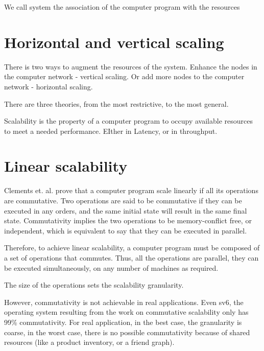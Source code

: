 We call system the association of the computer program with the resources


\section{Horizontal and vertical scaling}

There is two ways to augment the resources of the system.
Enhance the nodes in the computer network - vertical scaling.
Or add more nodes to the computer network - horizontal scaling.



There are three theories, from the most restrictive, to the most general.


Scalability is the property of a computer program to occupy available resources to meet a needed performance.
EIther in Latency, or in throughput.







\section{Linear scalability}

Clements et. al. \cite{Clements2013a} prove that a computer program scale linearly if all its operations are commutative.
Two operations are said to be commutative if they can be executed in any orders, and the same initial state will result in the same final state.
Commutativity implies the two operations to be memory-conflict free, or independent, which is equivalent to say that they can be executed in parallel.

Therefore, to achieve linear scalability, a computer program must be composed of a set of operations that commutes.
Thus, all the operations are parallel, they can be executed simultaneously, on any number of machines as required.

The size of the operations sets the scalability granularity.

However, commutativity is not achievable in real applications.
Even sv6, the operating system resulting from the work on commutative scalability only has 99\% commutativity.
For real application, in the best case, the granularity is coarse, in the worst case, there is no possible commutativity because of shared resources (like a product inventory, or a friend graph).


